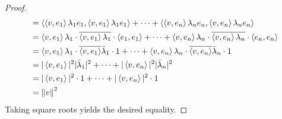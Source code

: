 \documentclass[../main.tex]{subfiles}
\begin{document}
\begin{itemize}
\begin{theorem}
\begin{proof}
\begin{align*}
                &= \left\langle{\left\langle{v},{e_1}\right\rangle\lambda_1e_1},{\left\langle{v},{e_1}\right\rangle\lambda_1e_1}\right\rangle+\cdots+\left\langle{\left\langle{v},{e_n}\right\rangle\lambda_ne_n},{\left\langle{v},{e_n}\right\rangle\lambda_ne_n}\right\rangle\\
                &= \left\langle{v},{e_1}\right\rangle\lambda_1\cdot\overline{\left\langle{v},{e_1}\right\rangle\lambda_1}\cdot\left\langle{e_1},{e_1}\right\rangle+\cdots+\left\langle{v},{e_n}\right\rangle\lambda_n\cdot\overline{\left\langle{v},{e_n}\right\rangle\lambda_n}\cdot\left\langle{e_n},{e_n}\right\rangle\\
                &= \left\langle{v},{e_1}\right\rangle\lambda_1\cdot\overline{\left\langle{v},{e_1}\right\rangle}\bar{\lambda}_1\cdot 1+\cdots+\left\langle{v},{e_n}\right\rangle\lambda_n\cdot\overline{\left\langle{v},{e_n}\right\rangle}\bar{\lambda}_n\cdot 1\\
                &= |\left\langle{v},{e_1}\right\rangle|^2|\bar{\lambda}_1|^2+\cdots+|\left\langle{v},{e_n}\right\rangle|^2|\bar{\lambda}_n|^2\\
                &= |\left\langle{v},{e_1}\right\rangle|^2\cdot 1+\cdots+|\left\langle{v},{e_n}\right\rangle|^2\cdot 1\\
                &= \norm{v}^2
            \end{align*}
            Taking square roots yields the desired equality.
        \end{proof}
    \end{theorem}
\end{itemize}
\end{document}
